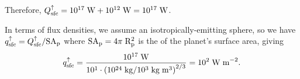 \documentclass[10pt,a4paper]{article}
\begin{document}
Therefore, $Q_{\rm sfc}^{\uparrow} = 10^{17} \; {\rm W} + 10^{12} \; {\rm W} = 10^{17} \; {\rm W}$.

In terms of flux densities, we assume an isotropically-emitting sphere, so we have $q_{\rm sfc}^{\uparrow} = Q_{\rm sfc}^{\uparrow}/\rm{SA}_p$ where $\rm{SA}_p = 4\pi\;R_p^2$ is the of the planet's surface area, giving 
\begin{equation}
q_{\rm sfc}^{\uparrow} = \frac{10^{17} \; {\rm W}}{10^1 \cdot \left(10^{24}\;{\rm kg}/10^3 \; {\rm kg}\;{\rm m}^3\right)^{2/3}} = 10^2 \; \rm{W\;m}^{-2}.
\end{equation}
\end{document}
